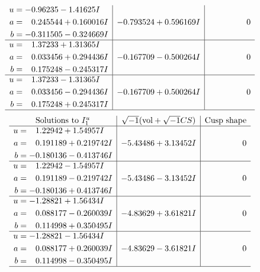 \documentclass[1p]{elsarticle_modified}
\theoremstyle{definition}
\newcommand{\I}{\sqrt{-1}}
\begin{document}
$$\begin{array}{c|c|c}
\begin{aligned}
u &= -0.96235 - 1.41625 I \\
a &= \phantom{-}0.245544 + 0.160016 I \\
b &= -0.311505 - 0.324669 I\end{aligned}
 & -0.793524 + 0.596169 I & \phantom{-0.000000 } 0 \\ \hline\begin{aligned}
u &= \phantom{-}1.37233 + 1.31365 I \\
a &= \phantom{-}0.033456 + 0.294436 I \\
b &= \phantom{-}0.175248 - 0.245317 I\end{aligned}
 & -0.167709 - 0.500264 I & \phantom{-0.000000 } 0 \\ \hline\begin{aligned}
u &= \phantom{-}1.37233 - 1.31365 I \\
a &= \phantom{-}0.033456 - 0.294436 I \\
b &= \phantom{-}0.175248 + 0.245317 I\end{aligned}
 & -0.167709 + 0.500264 I & \phantom{-0.000000 } 0\\
 \hline 
 \end{array}$$\newpage$$\begin{array}{c|c|c}  
\text{Solutions to }I^u_{1}& \I (\text{vol} + \sqrt{-1}CS) & \text{Cusp shape}\\
 \hline 
\begin{aligned}
u &= \phantom{-}1.22942 + 1.54957 I \\
a &= \phantom{-}0.191189 + 0.219742 I \\
b &= -0.180136 - 0.413746 I\end{aligned}
 & -5.43486 + 3.13452 I & \phantom{-0.000000 } 0 \\ \hline\begin{aligned}
u &= \phantom{-}1.22942 - 1.54957 I \\
a &= \phantom{-}0.191189 - 0.219742 I \\
b &= -0.180136 + 0.413746 I\end{aligned}
 & -5.43486 - 3.13452 I & \phantom{-0.000000 } 0 \\ \hline\begin{aligned}
u &= -1.28821 + 1.56434 I \\
a &= \phantom{-}0.088177 - 0.260039 I \\
b &= \phantom{-}0.114998 + 0.350495 I\end{aligned}
 & -4.83629 + 3.61821 I & \phantom{-0.000000 } 0 \\ \hline\begin{aligned}
u &= -1.28821 - 1.56434 I \\
a &= \phantom{-}0.088177 + 0.260039 I \\
b &= \phantom{-}0.114998 - 0.350495 I\end{aligned}
 & -4.83629 - 3.61821 I & \phantom{-0.000000 } 0\\
 \hline 
 \end{array}$$\newpage\newpage\renewcommand{\arraystretch}{1}
\end{document}
